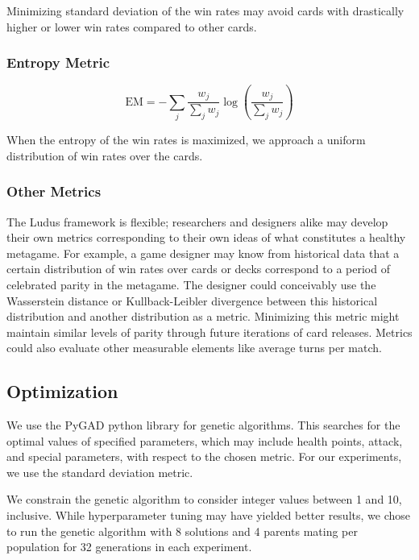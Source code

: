 Minimizing standard deviation of the win rates may avoid cards with
drastically higher or lower win rates compared to other cards.

\subsubsection{Entropy Metric}

\begin{equation}
	\mathrm{EM} = -\sum_j \frac{w_j}{\sum_j w_j} \log\left(\frac{w_j}{\sum_j w_j}\right)
\end{equation}

When the entropy of the win rates is maximized, we approach a uniform
distribution of win rates over the cards.

\subsubsection{Other Metrics} \label{sec:othermetrics}

The {\sc Ludus} framework is flexible; researchers and designers alike may develop their own metrics corresponding to their
own ideas of what constitutes a healthy metagame. For example, a game designer may know from historical data that
a certain distribution of win rates over cards or decks correspond to a period of celebrated parity in the metagame. 
The designer could conceivably use the Wasserstein distance or Kullback-Leibler 
divergence between this historical distribution and another distribution as a metric. Minimizing this metric 
might maintain similar levels of parity through future iterations of card releases.
Metrics could also evaluate other measurable elements like average turns per match.

\subsection{Optimization} \label{sec:optimization}

We use the PyGAD python library \cite{gad2021pygad} for genetic %
algorithms. This searches for the optimal values of
specified parameters, which may include health points, attack, and special parameters, with respect to %
the chosen metric. For our experiments, we use the standard deviation metric.

We constrain the genetic algorithm to consider integer values between 1 and 10, inclusive. While hyperparameter tuning may have yielded better results,
we chose to run the genetic algorithm with 8 solutions and 4 parents mating per population for 32 generations in each experiment.

